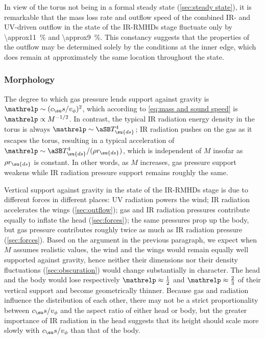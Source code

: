 \documentclass[twocolumn]{article}
\newcommand*\irrmhd{\ac{IR}\protect\nobreakdash-\acp{RMHD}}
\begin{document}
In view of the torus not being in a formal steady state (\cref{sec:steady
state}), it is remarkable that the mass loss rate and outflow speed of the
combined \ac{IR}- and \ac{UV}-driven outflow in the  state of
the \irrmhd{} stage fluctuate only by \SI{\approx11}{\percent} and
\SI{\approx9}{\percent}. This constancy suggests that the properties of the
outflow may be determined solely by the conditions at the inner edge, which
does remain at approximately the same location throughout the
 state.

\subsubsection{Morphology}
\label{sec:realistic morphology}

The degree to which gas pressure lends support against gravity is
$\mathrelp\sim(c_\su s/v_\phi)^2$, which according to \cref{eq:mass and sound
speed} is $\mathrelp\propto M^{-1/2}$. In contrast, the typical \ac{IR}
radiation energy density in the torus is always $\mathrelp\sim\aSB
T_\su{ds}^4$; \ac{IR} radiation pushes on the gas as it escapes the torus,
resulting in a typical acceleration of $\mathrelp\sim\aSB T_\su{ds}^4/(\rho
r_\su{ds})$, which is independent of $M$ insofar as $\rho r_\su{ds}$ is
constant. In other words, as $M$ increases, gas pressure support weakens while
\ac{IR} radiation pressure support remains roughly the same.

Vertical support against gravity in the  state of the
\irrmhd{} stage is due to different forces in different places: \ac{UV}
radiation powers the wind; \ac{IR} radiation accelerates the wings
(\cref{sec:outflow}); gas and \ac{IR} radiation pressures contribute equally to
inflate the head (\cref{sec:forces}); the same pressures prop up the body, but
gas pressure contributes roughly twice as much as \ac{IR} radiation pressure
(\cref{sec:forces}). Based on the argument in the previous paragraph, we expect
when $M$ assumes realistic values, the wind and the wings would remain equally
well supported against gravity, hence neither their dimensions nor their
density fluctuations (\cref{sec:obscuration}) would change substantially in
character. The head and the body would lose respectively
$\mathrelp\approx\tfrac12$ and $\mathrelp\approx\tfrac23$ of their vertical
support and become geometrically thinner. Because gas and radiation influence
the distribution of each other, there may not be a strict proportionality
between $c_\su s/v_\phi$ and the aspect ratio of either head or body, but the
greater importance of \ac{IR} radiation in the head suggests that its height
should scale more slowly with $c_\su s/v_\phi$ than that of the body.
\end{document}
